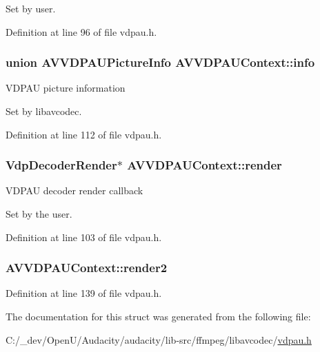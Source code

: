 Set by user. 

Definition at line 96 of file vdpau.\+h.

\subsubsection[{\texorpdfstring{info}{info}}]{ union {\bf A\+V\+V\+D\+P\+A\+U\+Picture\+Info} A\+V\+V\+D\+P\+A\+U\+Context\+::info}\hypertarget{struct_a_v_v_d_p_a_u_context_af2826dbf7db72ddae2376372db67bd82}{}\label{struct_a_v_v_d_p_a_u_context_af2826dbf7db72ddae2376372db67bd82}
V\+D\+P\+AU picture information

Set by libavcodec. 

Definition at line 112 of file vdpau.\+h.

\subsubsection[{\texorpdfstring{render}{render}}]{\setlength{\rightskip}{0pt plus 5cm}Vdp\+Decoder\+Render$\ast$ A\+V\+V\+D\+P\+A\+U\+Context\+::render}\hypertarget{struct_a_v_v_d_p_a_u_context_ac007e73409f8171d5aa26c2c1b72454c}{}\label{struct_a_v_v_d_p_a_u_context_ac007e73409f8171d5aa26c2c1b72454c}
V\+D\+P\+AU decoder render callback

Set by the user. 

Definition at line 103 of file vdpau.\+h.

\subsubsection[{\texorpdfstring{render2}{render2}}]{ A\+V\+V\+D\+P\+A\+U\+Context\+::render2}\hypertarget{struct_a_v_v_d_p_a_u_context_af220e2bf6c0093dd63c8384dccccd3d8}{}\label{struct_a_v_v_d_p_a_u_context_af220e2bf6c0093dd63c8384dccccd3d8}


Definition at line 139 of file vdpau.\+h.



The documentation for this struct was generated from the following file\+:\begin{DoxyCompactItemize}
\item 
C\+:/\+\_\+dev/\+Open\+U/\+Audacity/audacity/lib-\/src/ffmpeg/libavcodec/\hyperlink{vdpau_8h}{vdpau.\+h}\end{DoxyCompactItemize}
